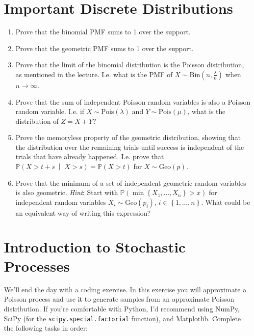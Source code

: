 \documentclass{article}
\begin{document}
\section{Important Discrete Distributions}

\begin{enumerate}
    \item Prove that the binomial PMF sums to 1 over the support. 
    \item Prove that the geometric PMF sums to 1 over the support.
    \item Prove that the limit of the binomial distribution is the Poisson distribution, as mentioned in the lecture. I.e. what is the PMF of \(X \sim \textrm{Bin}\left(n, \frac{\lambda}{n}\right)\) when \(n\rightarrow\infty\).
    \item Prove that the sum of independent Poisson random variables is also a Poisson random variable. I.e. if \(X \sim \textrm{Pois}\left(\lambda\right)\) and \(Y \sim \textrm{Pois}\left(\mu\right)\), what is the distribution of \(Z = X + Y\)?
    \item Prove the memoryless property of the geometric distribution, showing that the distribution over the remaining trials until success is independent of the trials that have already happened. I.e. prove that \(\mathbb{P}\left(X > t + s \;\middle|\; X > s\right) = \mathbb{P}\left(X > t\right)\) for \(X \sim \textrm{Geo}\left(p\right)\).
    \item Prove that the minimum of a set of independent geometric random variables is also geometric. \textit{Hint}: Start with \(\mathbb{P}\left(\min\left\{X_1, \dots, X_n\right\} > x\right)\) for independent random variables \(X_i \sim \textrm{Geo}\left(p_i\right)\), \(i \in \left\{1, \dots, n\right\}\). What could be an equivalent way of writing this expression?
\end{enumerate}

\section{Introduction to Stochastic Processes}

We'll end the day with a coding exercise. In this exercise you will approximate a Poisson process and use it to generate samples from an approximate Poisson distribution. If you're comfortable with Python, I'd recommend using NumPy, SciPy (for the \texttt{scipy.special.factorial} function), and Matplotlib. Complete the following tasks in order:
\end{document}
